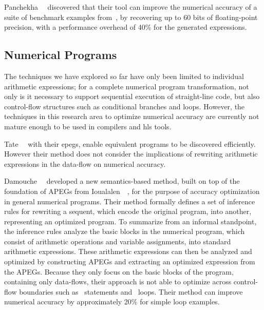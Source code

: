 Panchekha~\etal~\cite{panchekha15} discovered that their tool can improve the
numerical accuracy of a suite of benchmark examples from~\cite{hamming86},
by recovering up to 60 bits of floating-point precision, with a performance
overhead of 40\% for the generated expressions.


\subsection{Numerical Programs}
\label{bg:sub:numerical_programs}

The techniques we have explored so far have only been limited to individual
arithmetic expressions; for a complete numerical program transformation, not
only is it necessary to support sequential execution of straight-line code,
but also control-flow structures such as conditional branches and loops.
However, the techniques in this research area to optimize numerical accuracy
are currently not mature enough to be used in compilers and \gls{hls} tools.

Tate~\etal~\cite{tate09} with their \glspl{epeg}, enable equivalent programs
to be discovered efficiently.  However their method does not consider the
implications of rewriting arithmetic expressions in the data-flow on numerical
accuracy.

Damouche~\etal~\cite{damouche15} developed a new semantics-based method, built
on top of the foundation of APEGs from Ioualalen~\etal~\cite{ioualalen}, for
the purpose of accuracy optimization in general numerical programs.  Their
method formally defines a set of inference rules for rewriting a sequent,
which encode the original program, into another, representing an optimized
program.  To summarize from an informal standpoint, the inference rules
analyze the basic blocks in the numerical program, which consist of arithmetic
operations and variable assignments, into standard arithmetic expressions.
These arithmetic expressions can then be analyzed and optimized by constructing
APEGs and extracting an optimized expression from the APEGs.  Because they
only focus on the basic blocks of the program, containing only data-flows,
their approach is not able to optimize across control-flow boundaries such as
\iflit~statements and \whilelit~loops.  Their method can improve numerical
accuracy by approximately 20\% for simple loop examples.



